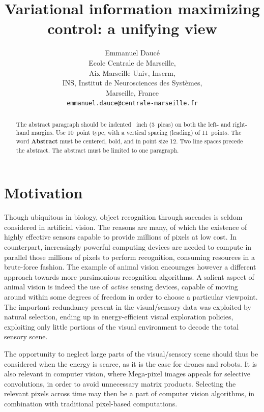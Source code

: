 \documentclass{article}
\title{Variational information maximizing control: a unifying view}
\author{
  Emmanuel Daucé\\
  Ecole Centrale de Marseille,\\ 
  Aix Marseille Univ, Inserm,\\ 
  INS, Institut de Neurosciences des Systèmes, \\
  Marseille, France\\
  \texttt{emmanuel.dauce@centrale-marseille.fr} \\
}
\begin{document}

\maketitle

\begin{abstract}
  The abstract paragraph should be indented ~inch
  (3~picas) on both the left- and right-hand margins. Use 10~point
  type, with a vertical spacing (leading) of 11~points.  The word
  \textbf{Abstract} must be centered, bold, and in point size 12. Two
  line spaces precede the abstract. The abstract must be limited to
  one paragraph.
\end{abstract}

\section{Motivation}

Though ubiquitous in biology, object recognition through saccades is seldom considered in artificial vision. The reasons are many, of which the existence of highly effective sensors capable to provide millions of pixels at low cost. %
In counterpart, increasingly powerful computing devices are needed to compute in parallel those millions of pixels to perform recognition, consuming resources in a brute-force fashion. 
The example of animal vision encourages however a different approach towards more parsimonious recognition algorithms. A salient aspect of animal vision is indeed the use of \emph{active} sensing devices, capable of moving around within some degrees of freedom in order to choose a particular viewpoint. The important redundancy present in the {\color{blue} visual/sensory} data was exploited by natural selection,  ending up in energy-efficient visual exploration policies, exploiting only little portions of the visual environment to decode the total sensory scene.

The opportunity to neglect large parts of the {\color{blue} visual/sensory} scene should thus be considered when the energy is scarce, as it is the case for drones and robots. 
It is also relevant in computer vision, where Mega-pixel images appeals for selective convolutions, in order to avoid unnecessary matrix products. 
Selecting the relevant pixels across time may then be a part of computer vision algorithms, in combination with traditional pixel-based computations. 
\end{document}
